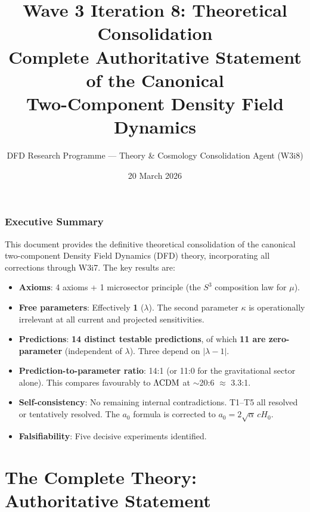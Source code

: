 \documentclass[11pt]{article}
\title{Wave 3 Iteration 8: Theoretical Consolidation\\
\large Complete Authoritative Statement of the Canonical\\
Two-Component Density Field Dynamics}
\author{DFD Research Programme --- Theory \& Cosmology Consolidation Agent (W3i8)}
\date{20 March 2026}
\newcommand{\aM}{a_0}
\newcommand{\LCDM}{\Lambda{\rm CDM}}
\newcommand{\Hzero}{H_0}
\newcommand{\lamdiff}{|\lambda{-}1|}
\newcommand{\mufd}{\mu}
\begin{document}
\maketitle
\tableofcontents
\newpage

\section*{Executive Summary}

This document provides the definitive theoretical consolidation of the
canonical two-component Density Field Dynamics (DFD) theory, incorporating
all corrections through W3i7. The key results are:

\begin{itemize}[nosep]
\item \textbf{Axioms}: 4 axioms + 1 microsector principle (the $S^3$
  composition law for $\mufd$).
\item \textbf{Free parameters}: Effectively \textbf{1} ($\lambda$).
  The second parameter $\kappa$ is operationally irrelevant at all
  current and projected sensitivities.
\item \textbf{Predictions}: \textbf{14 distinct testable predictions},
  of which \textbf{11 are zero-parameter} (independent of $\lambda$).
  Three depend on $\lamdiff$.
\item \textbf{Prediction-to-parameter ratio}: 14:1 (or 11:0 for the
  gravitational sector alone). This compares favourably to $\LCDM$
  at $\sim$20:6 $\approx$ 3.3:1.
\item \textbf{Self-consistency}: No remaining internal contradictions.
  T1--T5 all resolved or tentatively resolved. The $\aM$ formula
  is corrected to $\aM = 2\sqrt{\alpha}\,c\Hzero$.
\item \textbf{Falsifiability}: Five decisive experiments identified.
\end{itemize}


\part{The Complete Theory: Authoritative Statement}
\label{part:theory}
\end{document}
